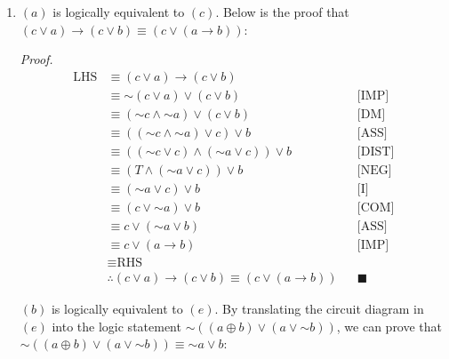 \documentclass[11pt, notitlepage]{article}
\newcommand*{\oldneg}{\mathord{\sim}}
\begin{document}
\begin{enumerate}
\item $(a)$ is logically equivalent to $(c)$. Below is the proof that $(c \vee a) \to (c \vee b) \equiv (c \vee (a \to b))$:

\textit{Proof.}
\vspace{-25pt}
\begin{align*}
 	\textrm{LHS} &\equiv (c \vee a) \to (c \vee b)\\
 		&\equiv \oldneg (c \vee a) \vee (c \vee b) && \textrm{[IMP]}\\
 		&\equiv (\oldneg c \wedge \oldneg a) \vee (c \vee b) && \textrm{[DM]}\\
 		&\equiv ((\oldneg c \wedge \oldneg a) \vee c) \vee b && \textrm{[ASS]}\\
 		&\equiv ((\oldneg c \vee c) \wedge (\oldneg a \vee c)) \vee b && \textrm{[DIST]}\\
 		&\equiv (T \wedge (\oldneg a \vee c)) \vee b && \textrm{[NEG]}\\
 		&\equiv (\oldneg a \vee c) \vee b && \textrm{[I]}\\
 		&\equiv (c \vee \oldneg a) \vee b && \textrm{[COM]}\\
 		&\equiv c \vee (\oldneg a \vee b) && \textrm{[ASS]}\\
 		&\equiv c \vee (a \to b) && \textrm{[IMP]}\\
 		&\equiv \textrm{RHS}\\
 		&\therefore (c \vee a) \to (c \vee b) \equiv (c \vee (a \to b)) && \blacksquare
\end{align*}

$(b)$ is logically equivalent to $(e)$. By translating the circuit diagram in $(e)$ into the logic statement $\oldneg ((a \oplus b) \vee (a \vee \oldneg b))$, we can prove that $\oldneg ((a \oplus b) \vee (a \vee \oldneg b)) \equiv \oldneg a \vee b$:


\end{enumerate}
\end{document}
